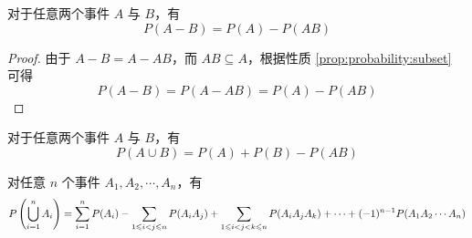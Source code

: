 \begin{property}
    \indent 对于任意两个事件 $A$ 与 $B$，有
    \begin{equation}
        P(A-B)=P(A)-P(AB)
    \end{equation}
\end{property}

\begin{proof}
    由于 $A-B=A-AB$，而 $AB \subseteq A$，根据性质 \ref{prop:probability:subset} 可得
    \[
    P(A-B)=P(A-AB)=P(A)-P(AB)
    \]
\end{proof}

\begin{property}
    \indent 对于任意两个事件 $A$ 与 $B$，有
    \begin{equation} \label{equation:add}
        P(A \cup B) = P(A) + P(B) - P(AB)
    \end{equation}

    对任意 $n$ 个事件 $A_1,A_2,\cdots,A_n$，有
    \begin{equation} \label{equation:normal add}
        \small P \left( \bigcup_{i=1}^n A_i \right) = \sum_{i=1}^n P(A_i) - \sum_{1 \leqslant i<j \leqslant n} P(A_i A_j) + \sum_{1 \leqslant i<j<k \leqslant n} P(A_i A_j A_k) + \cdots + (-1)^{n-1} P(A_1 A_2 \cdots A_n)
    \end{equation}
\end{property}

